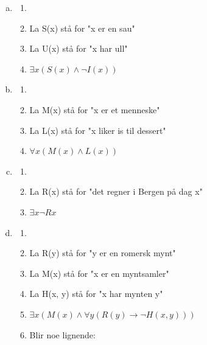 \documentclass{article}
\begin{document}
\begin{enumerate}[(a)]
    \item \textbf{}    
    \begin{enumerate}[-]
        \item {}
        \item La S(x) stå for "x er en sau"
        \item La U(x) stå for "x har ull"
        \item $\exists x (S(x) \wedge \neg I(x))$
    \end{enumerate}
    \item \textbf{}
    \begin{enumerate}[-]
        \item {}
        \item La M(x) stå for "x er et menneske"
        \item La L(x) stå for "x liker is til dessert"
        \item $\forall x (M(x) \wedge L(x))$
    \end{enumerate}
    \item \textbf{}
    \begin{enumerate}[-]
        \item {}
        \item La R(x) stå for "det regner i Bergen på dag x"
        \item $\exists x \neg Rx$
    \end{enumerate}
    \item {}
    \begin{enumerate}[-]
        \item {}
        \item La R(y) stå for "y er en romersk mynt"
        \item La M(x) stå for "x er en myntsamler"
        \item La H(x, y) stå for "x har mynten y"
        \item $\exists x (M(x) \land \forall y (R(y) \rightarrow \neg H(x, y)))$
        \item Blir noe lignende: 

\end{enumerate}
\end{enumerate}
\end{document}
